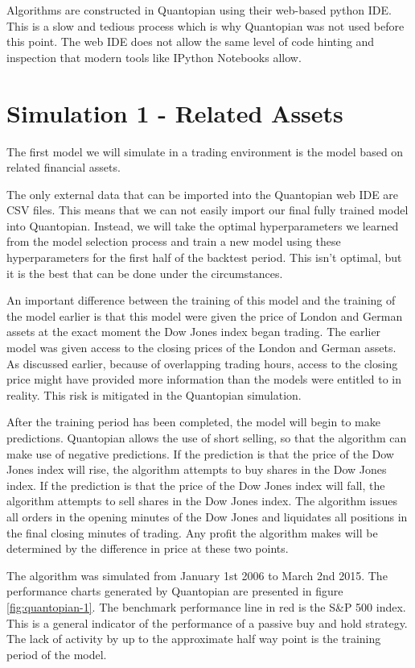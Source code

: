 \documentclass{report}
\begin{document}
Algorithms are constructed in Quantopian using their web-based python IDE. This is a slow and tedious process which is why Quantopian was not used before this point. The web IDE does not allow the same level of code hinting and inspection that modern tools like IPython Notebooks allow.

\section{Simulation 1 - Related Assets}

The first model we will simulate in a trading environment is the model based on related financial assets. 

The only external data that can be imported into the Quantopian web IDE are CSV files. This means that we can not easily import our final fully trained model into Quantopian. Instead, we will take the optimal hyperparameters we learned from the model selection process and train a new model using these hyperparameters for the first half of the backtest period. This isn't optimal, but it is the best that can be done under the circumstances.

An important difference between the training of this model and the training of the model earlier is that this model were given the price of London and German assets at the exact moment the Dow Jones index began trading. The earlier model was given access to the closing prices of the London and German assets. As discussed earlier, because of overlapping trading hours, access to the closing price might have provided more information than the models were entitled to in reality. This risk is mitigated in the Quantopian simulation.

After the training period has been completed, the model will begin to make predictions. Quantopian allows the use of short selling, so that the algorithm can make use of negative predictions. If the prediction is that the price of the Dow Jones index will rise, the algorithm attempts to buy shares in the Dow Jones index. If the prediction is that the price of the Dow Jones index will fall, the algorithm attempts to sell shares in the Dow Jones index. The algorithm issues all orders in the opening minutes of the Dow Jones and liquidates all positions in the final closing minutes of trading. Any profit the algorithm makes will be determined by the difference in price at these two points.

The algorithm was simulated from January 1st 2006 to March 2nd 2015. The performance charts generated by Quantopian are presented in figure \ref{fig:quantopian-1}. The benchmark performance line in red is the S\&P 500 index. This is a general indicator of the performance of a passive buy and hold strategy. The lack of activity by up to the approximate half way point is the training period of the model.
\end{document}
